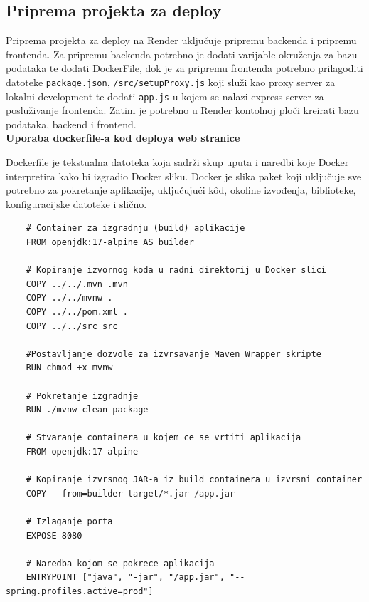 			\subsection{Priprema projekta za deploy}
			
			Priprema projekta za deploy na Render uključuje pripremu backenda i pripremu frontenda. Za pripremu backenda potrebno je dodati varijable okruženja za bazu podataka te dodati DockerFile, dok je za pripremu frontenda potrebno prilagoditi datoteke \texttt{package.json},  \texttt{/src/setupProxy.js} koji služi kao proxy server za lokalni development te dodati \texttt{app.js} u kojem se nalazi express server za posluživanje frontenda. Zatim je potrebno u Render kontolnoj ploči kreirati bazu podataka, backend i frontend.\\
			
			\noindent \textbf{Uporaba dockerfile-a kod deploya web stranice}
			
			\vspace{0.2cm}
			
			
			\noindent Dockerfile je tekstualna datoteka koja sadrži skup uputa i naredbi koje Docker interpretira kako bi izgradio Docker sliku. Docker je slika paket koji uključuje sve potrebno za pokretanje aplikacije, uključujući kôd, okoline izvođenja, biblioteke, konfiguracijske datoteke i slično.
			
			
			
\begin{lstlisting}
	# Container za izgradnju (build) aplikacije
	FROM openjdk:17-alpine AS builder
	
	# Kopiranje izvornog koda u radni direktorij u Docker slici
	COPY ../../.mvn .mvn
	COPY ../../mvnw .
	COPY ../../pom.xml .
	COPY ../../src src
	
	#Postavljanje dozvole za izvrsavanje Maven Wrapper skripte
	RUN chmod +x mvnw
	
	# Pokretanje izgradnje
	RUN ./mvnw clean package
	
	# Stvaranje containera u kojem ce se vrtiti aplikacija
	FROM openjdk:17-alpine
	
	# Kopiranje izvrsnog JAR-a iz build containera u izvrsni container
	COPY --from=builder target/*.jar /app.jar
	
	# Izlaganje porta
	EXPOSE 8080
	
	# Naredba kojom se pokrece aplikacija
	ENTRYPOINT ["java", "-jar", "/app.jar", "--spring.profiles.active=prod"]
\end{lstlisting}
			
